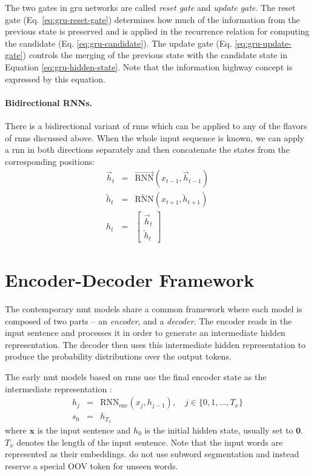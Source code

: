 The two gates in \gls{gru} networks are called \emph{reset gate} and
\emph{update gate}.  The reset gate (Eq. \ref{eq:gru-reset-gate}) determines how
much of the information from the previous state is preserved and is applied in
the recurrence relation for computing the candidate
(Eq. \ref{eq:gru-candidate}). The update gate (Eq.  \ref{eq:gru-update-gate})
controls the merging of the previous state with the candidate state in Equation
\ref{eq:gru-hidden-state}. Note that the information highway concept is
expressed by this equation.

\paragraph{Bidirectional RNNs.} There is a bidirectional variant of \glspl{rnn}
which can be applied to any of the flavors of \glspl{rnn} discussed above. When
the whole input sequence is known, we can apply a \gls{rnn} in both directions
separately and then concatenate the states from the corresponding positions:
%
\begin{eqnarray} \overrightarrow{h}_t & = &
\overrightarrow{\mathrm{RNN}}(x_{t-1}, \overrightarrow{h}_{t-1}) \\
\overleftarrow{h}_t & = & \overleftarrow{\mathrm{RNN}}(x_{t+1},
\overleftarrow{h}_{t+1}) \\ h_t & = & \left[ \begin{matrix} \overrightarrow{h}_t
\\ \overleftarrow{h}_t
\end{matrix} \right]
\end{eqnarray}

\section{Encoder-Decoder Framework}
\label{sec:encdec}

The contemporary \gls{nmt} models share a common framework where each model is
composed of two parts -- an \emph{encoder}, and a \emph{decoder}. The encoder
reads in the input sentence and processes it in order to generate an
intermediate hidden representation.  The decoder then uses this intermediate
hidden representation to produce the probability distributions over the output
tokens.

The early \gls{nmt} models based on \glspl{rnn} use the final encoder state as
the intermediate representation \citep{sutskever2014sequence}:
%
\begin{eqnarray} h_j & = & \mathrm{RNN}_{\text{enc}}(x_j, h_{j-1}), \quad j \in
\{0, 1, \ldots, T_x \} \\ s_0 & = & h_{T_x}
\end{eqnarray}
%
where $\mathbf{x}$ is the input sentence and $h_0$ is the initial hidden state,
usually set to $\mathbf{0}$. $T_x$ denotes the length of the input sentence.
Note that the input words are represented as their embeddings.
\citet{sutskever2014sequence} do not use subword segmentation and instead
reserve a special OOV token for unseen words.

